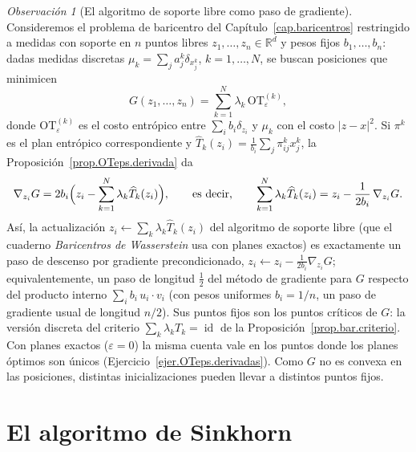 \documentclass[12pt, a4paper]{amsbook}
\newcommand{\id}{\operatorname{id}}
\newcommand{\R}{{\mathbb R}}
\theoremstyle{remark}
\newtheorem{obs}[teo]{Observación}
\theoremstyle{definition}
\numberwithin{section}{chapter}
\numberwithin{subsection}{section}
\numberwithin{equation}{section}
\numberwithin{figure}{chapter}
\begin{document}
\begin{obs}[El algoritmo de soporte libre como paso de gradiente]\label{obs.soporte.libre}
Consideremos el problema de baricentro del Capítulo~\ref{cap.baricentros}
restringido a medidas con soporte en $n$ puntos libres $z_1,\dots,z_n\in\R^d$
y pesos fijos $b_1,\dots,b_n$: dadas medidas discretas
$\mu_k=\sum_ja^k_j\delta_{x^k_j}$, $k=1,\dots,N$, se buscan posiciones que
minimicen
\[
G(z_1,\dots,z_n)=\sum_{k=1}^N\lambda_k\,\mathrm{OT}^{(k)}_\varepsilon,
\]
donde $\mathrm{OT}^{(k)}_\varepsilon$ es el costo entrópico entre
$\sum_ib_i\delta_{z_i}$ y $\mu_k$ con el costo $|z-x|^2$. Si $\pi^k$ es el
plan entrópico correspondiente y
$\widehat T_k(z_i)=\frac1{b_i}\sum_j\pi^k_{ij}x^k_j$, la
Proposición~\ref{prop.OTeps.derivada} da
\[
\nabla_{z_i}G=2b_i\Bigl(z_i-\sum_{k=1}^N\lambda_k\widehat T_k(z_i)\Bigr),
\qquad\text{es decir,}\qquad
\sum_{k=1}^N\lambda_k\widehat T_k(z_i)=z_i-\frac1{2b_i}\,\nabla_{z_i}G.
\]
Así, la actualización $z_i\leftarrow\sum_k\lambda_k\widehat T_k(z_i)$ del
algoritmo de soporte libre (que el cuaderno \emph{Baricentros de
Wasserstein} usa con planes exactos) es exactamente un paso de descenso por
gradiente precondicionado, $z_i\leftarrow z_i-\frac1{2b_i}\nabla_{z_i}G$;
equivalentemente, un paso de longitud $\frac12$ del método de gradiente
para $G$ respecto del producto interno $\sum_ib_i\,u_i\cdot v_i$ (con pesos
uniformes $b_i=1/n$, un paso de gradiente usual de longitud $n/2$). Sus
puntos fijos son los puntos críticos de $G$: la versión
discreta del criterio $\sum_k\lambda_kT_k=\id$ de la
Proposición~\ref{prop.bar.criterio}. Con planes exactos ($\varepsilon=0$) la
misma cuenta vale en los puntos donde los planes óptimos son únicos
(Ejercicio~\ref{ejer.OTeps.derivadas}). Como $G$ no es convexa en las
posiciones, distintas inicializaciones pueden llevar a distintos puntos
fijos.
\end{obs}

\section{El algoritmo de Sinkhorn}\label{sec.sinkhorn}
\end{document}

